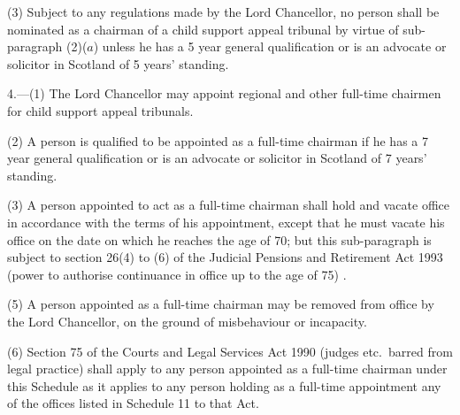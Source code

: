 \documentclass[12pt,a4paper]{article}
\begin{document}
(3) Subject to any regulations made by the Lord Chancellor, no person shall be nominated as a chairman of a child support appeal tribunal by virtue of sub-paragraph (2)($a$)  unless he has a 5 year general qualification or is an advocate or solicitor in Scotland of 5 years' standing.


\medskip

4.---(1) The Lord Chancellor may appoint regional and other full-time chairmen for child support appeal tribunals.

(2) A person is qualified to be appointed as a full-time chairman if he has a 7 year general qualification or is an advocate or solicitor in Scotland of 7 years' standing.

(3) A person appointed to act as a full-time chairman shall hold and vacate office in accordance with the terms of his appointment, except that he must vacate his office 
on the date on which he reaches the age of 70; but this sub-paragraph is subject to section 26(4) to (6) of the Judicial Pensions and Retirement Act 1993 (power to authorise continuance in office up to the age of 75)%
.


(5) A person appointed as a full-time chairman may be removed from office by the Lord Chancellor, on the ground of misbehaviour or incapacity.

(6) Section 75 of the Courts and Legal Services Act 1990 (judges etc.\ barred from legal practice) shall apply to any person appointed as a full-time chairman under this Schedule as it applies to any person holding as a full-time appointment any of the offices listed in Schedule 11 to that Act.
\end{document}
